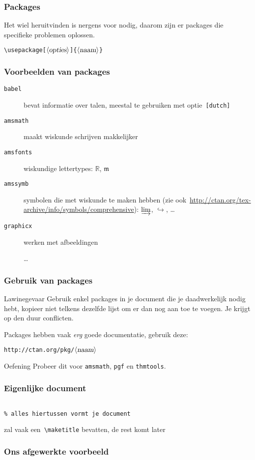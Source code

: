 \begin{frame}[fragile]
  \frametitle{Packages}
  Het wiel heruitvinden is nergens voor nodig, daarom zijn er packages die specifieke problemen oplossen.

  \textcolor{uagreen}{\texttt{\textbackslash usepackage}}\verb|[|$\langle\textsl{opties}\rangle$\verb|]{|$\langle\textsl{naam}\rangle$\verb|}|
\end{frame}

\begin{frame}[fragile]
  \frametitle{Voorbeelden van packages}

  \begin{description}
	\item[\texttt{babel}] bevat informatie over talen, meestal te gebruiken met optie~\texttt{[dutch]}
	\item[\texttt{amsmath}] maakt wiskunde schrijven makkelijker
	\item[\texttt{amsfonts}] wiskundige lettertypes: $\mathbb{R}$, $\mathfrak{m}$
	\item[\texttt{amssymb}] symbolen die met wiskunde te maken hebben (zie ook~\url{http://ctan.org/tex-archive/info/symbols/comprehensive}): $\varinjlim$, $\hookrightarrow$, \ldots
    \item[\texttt{graphicx}] werken met afbeeldingen
    \item[] \ldots
  \end{description}
\end{frame}

\begin{frame}[fragile]
  \frametitle{Gebruik van packages}

  \begin{alertblock}{Lawinegevaar}
    Gebruik enkel packages in je document die je daadwerkelijk nodig hebt, kopieer niet telkens dezelfde lijst om er dan nog aan toe te voegen. Je krijgt op den duur conflicten.
  \end{alertblock}

  Packages hebben vaak \emph{erg} goede documentatie, gebruik deze:

  \texttt{http://ctan.org/pkg/$\langle\textsl{naam}\rangle$}
  \pause
  \begin{exampleblock}{Oefening}
    Probeer dit voor \verb|amsmath|, \verb|pgf| en \verb|thmtools|.
  \end{exampleblock}
\end{frame}

\begin{frame}[fragile]
  \frametitle{Eigenlijke document}

  \begin{verbatim}

% alles hiertussen vormt je document

  \end{verbatim}

  zal vaak een~\texttt{\textcolor{uagreen}{\textbackslash maketitle}} bevatten, de rest komt later
\end{frame}

\begin{frame}[fragile]
  \frametitle{Ons afgewerkte voorbeeld}
  \small
  \inputminted{latex}{test-4.tex}
\end{frame}
